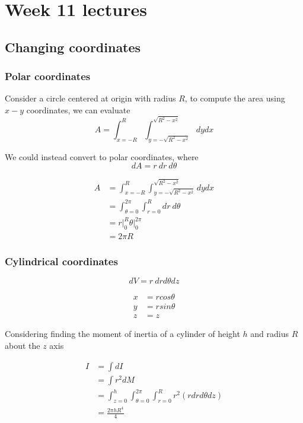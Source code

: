 \chapter{Week 11 lectures}

\section{Changing coordinates}

\subsection{Polar coordinates}

Consider a circle centered at origin with radius $R$, to compute the area using $x-y$ coordinates, we can evaluate
\[
   A = \int_{x = -R}^{R} \int_{y = -\sqrt{R^2 - x^2}}^{\sqrt{R^2 - x^2}} dy dx 
\] 

We could instead convert to polar coordinates, where
\[
  dA = r\ dr\ d \theta
\] 

\begin{align*}
   A &= \int_{x = -R}^{R} \int_{y = -\sqrt{R^2 - x^2}}^{\sqrt{R^2 - x^2}} dy dx  \\
     &= \int_{ \theta = 0 }^{2 \pi} \int_{r = 0}^{R} dr\ d \theta  \\
     &= \left. r \right|_{0}^{R} \left. \theta \right|_{0}^{2 \pi} \\
     &= 2 \pi R
\end{align*}

\subsection{Cylindrical coordinates}
\[
  dV = r\ drd \theta dz
\] 

\begin{align*}
   x &= r cos \theta \\
   y &= r sin \theta \\
   z &= z
\end{align*}

Considering finding the moment of inertia of a cylinder of height $h$ and radius $R$ about the $z$ axis

\begin{align*}
   I &= \int dI \\
     &= \int r^2 dM \\
     &= \int_{z= 0}^{h} \int_{ \theta = 0}^{2 \pi}  \int_{r=0}^{R} r^2 \left( r dr d \theta d z \right)  \\
     &= \frac{2\pi h R^4}{4}
\end{align*} 

